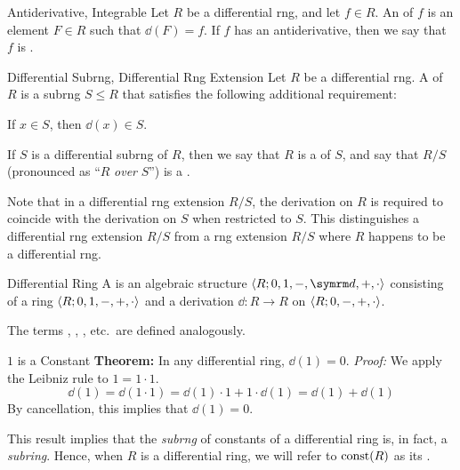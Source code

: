 \begin{dfnbox}{Antiderivative, Integrable}
	Let $R$ be a differential rng, and let $f \in R$. An  of $f$ is an element $F \in R$ such that $\dd(F) = f$. If $f$ has an antiderivative, then we say that $f$ is .
\end{dfnbox}

\begin{dfnbox}{Differential Subrng, Differential Rng Extension}
	Let $R$ be a differential rng. A  of $R$ is a subrng $S \le R$ that satisfies the following additional requirement:
	\begin{dfnitems}
		\item {} If $x \in S$, then $\dd(x) \in S$.
	\end{dfnitems}
	If $S$ is a differential subrng of $R$, then we say that $R$ is a  of $S$, and say that $R/S$ (pronounced as ``$R$ \textit{over} $S$'') is a .
\end{dfnbox}

Note that in a differential rng extension $R/S$, the derivation on $R$ is required to coincide with the derivation on $S$ when restricted to $S$. This distinguishes a differential rng extension $R/S$ from a rng extension $R/S$ where $R$ happens to be a differential rng.

\begin{dfnbox}{Differential Ring}
	A  is an algebraic structure $\alg{R; 0, 1, -, \dd, +, \cdot}$ consisting of a ring ${\langle {R; 0, 1, -, +, \cdot} \rangle}$ and a derivation $\dd: R \to R$ on ${\langle {R; 0, -, +, \cdot} \rangle}$.
\end{dfnbox}

The terms , , , etc.\ are defined analogously.

\begin{thmbox}{$1$ is a Constant}
	\textbf{Theorem:} In any differential ring, $\dd(1) = 0$.
	\tcblower
	\textit{Proof:} We apply the Leibniz rule to $1 = 1 \cdot 1$.
	\[ \dd(1) = \dd(1 \cdot 1) = \dd(1) \cdot 1 + 1 \cdot \dd(1) = \dd(1) + \dd(1) \]
	By cancellation, this implies that $\dd(1) = 0$.
\end{thmbox}

This result implies that the \textit{subrng} of constants of a differential ring is, in fact, a \textit{subring}. Hence, when $R$ is a differential ring, we will refer to $\operatorname{const}(R)$ as its .

